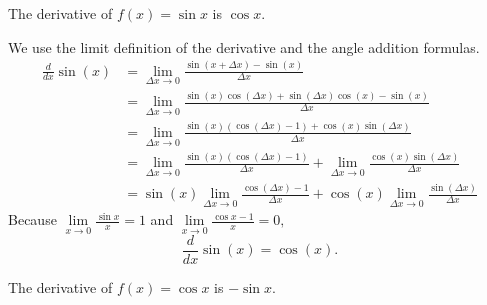 \documentclass{article}
\begin{document}
\begin{theo}
The derivative of $f(x) = \sin x$ is $\cos x.$
\end{theo}

\begin{pro}
We use the limit definition of the derivative and the angle addition formulas.
\begin{align*}
\frac{d}{dx}\sin(x) &= \lim_{\Delta x \to 0} \frac{\sin(x+\Delta x) - \sin(x)}{\Delta x} \\
&= \lim_{\Delta x \to 0} \frac{\sin(x)\cos(\Delta x) + \sin(\Delta x)\cos(x) - \sin(x)}{\Delta x} \\
&= \lim_{\Delta x \to 0} \frac{\sin(x)(\cos(\Delta x) - 1) + \cos(x)\sin(\Delta x)}{\Delta x} \\
&= \lim_{\Delta x \to 0} \frac{\sin(x)(\cos(\Delta x) - 1)}{\Delta x} + \lim_{\Delta x \to 0} \frac{\cos(x)\sin(\Delta x)}{\Delta x} \\
&= \sin(x) \lim_{\Delta x \to 0} \frac{\cos(\Delta x) - 1}{\Delta x} + \cos(x) \lim_{\Delta x \to 0} \frac{\sin(\Delta x)}{\Delta x}
\end{align*}
Because $\lim\limits_{x\to 0}\frac{\sin x}{x}=1$ and $\lim\limits_{x\to 0}\frac{\cos x-1}{x}=0,$
\[\frac{d}{dx}\sin(x) = \cos(x).\]
\end{pro}

\begin{theo}
The derivative of $f(x) = \cos x$ is $-\sin x.$
\end{theo}

\end{document}
